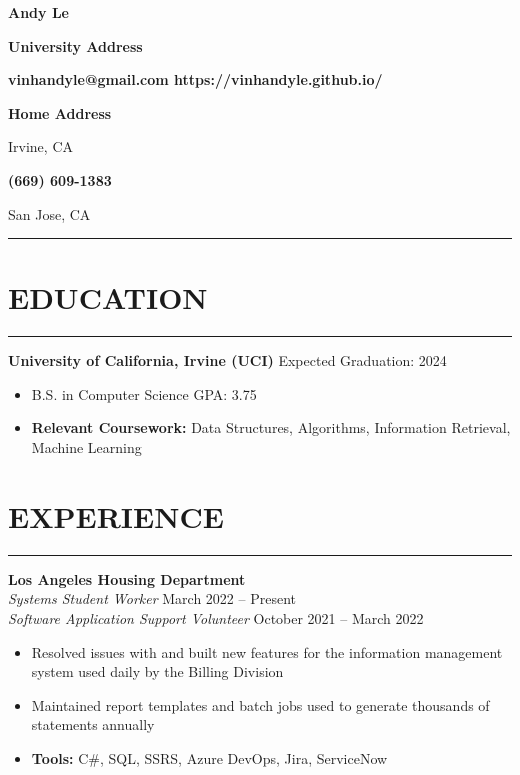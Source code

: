 \documentclass{article}
\newcommand\textline[4][t]{
  \par\noindent\parbox[#1]{.333\textwidth}{\raggedright\texttt{}#2}
  \parbox[#1]{.333\textwidth}{\centering#3}
  \parbox[#1]{.333\textwidth}{\raggedleft#4}\par
}
\begin{document}
	\textline[t]{}{\textbf{\Huge\textbf{Andy Le}}}{}
	\textline[t]{\textbf{University Address}}{\textbf{vinhandyle@gmail.com  https://vinhandyle.github.io/} }{\textbf{Home Address}}
	\textline[t]{Irvine, CA}{\textbf{(669) 609-1383}}{San Jose, CA}
	\vspace{10pt}

\vspace{-5pt} \hrule \vspace{-5pt}

\section*{EDUCATION} \vspace{-6pt} \hrule \vspace{6pt}
\textbf{University of California, Irvine (UCI)} \hfill Expected Graduation: 2024
\begin{itemize}
	\item\vspace{-6pt} B.S. in Computer Science  \hfill GPA: 3.75
	\item\vspace{-6pt}\textbf{Relevant Coursework:} Data Structures, Algorithms, Information Retrieval, Machine Learning
\end{itemize}
\vspace{-10pt}

\section*{EXPERIENCE} \vspace{-6pt} \hrule \vspace{6pt}
\textbf{Los Angeles Housing Department}\\
\emph{Systems Student Worker} \hfill March 2022 -- Present\\
\emph{Software Application Support Volunteer} \hfill October 2021 -- March 2022
\begin{itemize}
	\item\vspace{-6pt} Resolved issues with and built new features for the information management system used daily by the Billing Division
	\item\vspace{-6pt} Maintained report templates and batch jobs used to generate thousands of statements annually
	\item\vspace{-6pt} \textbf{Tools:} C\#, SQL, SSRS, Azure DevOps, Jira, ServiceNow
\end{itemize}
\vspace{-10pt}
\end{document}
